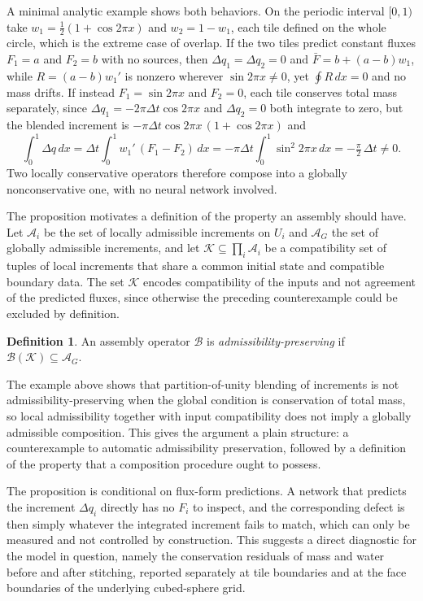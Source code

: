 \documentclass[11pt]{article}
\theoremstyle{definition}
\newtheorem{definition}{Definition}
\theoremstyle{remark}
\begin{document}
A minimal analytic example shows both behaviors. On the periodic interval $[0,1)$ take $w_1 = \tfrac12(1+\cos 2\pi x)$ and $w_2 = 1-w_1$, each tile defined on the whole circle, which is the extreme case of overlap. If the two tiles predict constant fluxes $F_1=a$ and $F_2=b$ with no sources, then $\Delta q_1=\Delta q_2=0$ and $\bar F = b+(a-b)w_1$, while $R=(a-b)w_1'$ is nonzero wherever $\sin 2\pi x\neq 0$, yet $\oint R\,dx = 0$ and no mass drifts. If instead $F_1=\sin 2\pi x$ and $F_2=0$, each tile conserves total mass separately, since $\Delta q_1 = -2\pi\Delta t\cos 2\pi x$ and $\Delta q_2=0$ both integrate to zero, but the blended increment is $-\pi\Delta t\cos 2\pi x\,(1+\cos 2\pi x)$ and
\begin{equation*}
\int_0^1 \Delta q\,dx = \Delta t\int_0^1 w_1'\,(F_1-F_2)\,dx = -\pi\Delta t\int_0^1\sin^2 2\pi x\,dx = -\tfrac{\pi}{2}\,\Delta t \neq 0 .
\end{equation*}
Two locally conservative operators therefore compose into a globally nonconservative one, with no neural network involved.

The proposition motivates a definition of the property an assembly should have. Let $\mathcal A_i$ be the set of locally admissible increments on $U_i$ and $\mathcal A_G$ the set of globally admissible increments, and let $\mathcal K\subseteq\prod_i\mathcal A_i$ be a compatibility set of tuples of local increments that share a common initial state and compatible boundary data. The set $\mathcal K$ encodes compatibility of the inputs and not agreement of the predicted fluxes, since otherwise the preceding counterexample could be excluded by definition.

\begin{definition}
An assembly operator $\mathcal B$ is \emph{admissibility-preserving} if $\mathcal B(\mathcal K)\subseteq \mathcal A_G$.
\end{definition}

The example above shows that partition-of-unity blending of increments is not admissibility-preserving when the global condition is conservation of total mass, so local admissibility together with input compatibility does not imply a globally admissible composition. This gives the argument a plain structure: a counterexample to automatic admissibility preservation, followed by a definition of the property that a composition procedure ought to possess.

The proposition is conditional on flux-form predictions. A network that predicts the increment $\Delta q_i$ directly has no $F_i$ to inspect, and the corresponding defect is then simply whatever the integrated increment fails to match, which can only be measured and not controlled by construction. This suggests a direct diagnostic for the model in question, namely the conservation residuals of mass and water before and after stitching, reported separately at tile boundaries and at the face boundaries of the underlying cubed-sphere grid.
\end{document}
